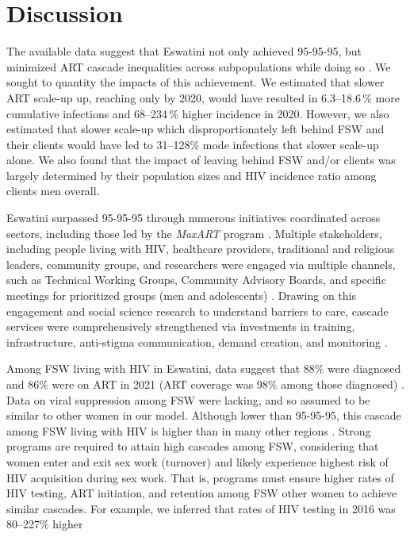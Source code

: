 \section{Discussion}\label{art.disc}
The available data suggest that Eswatini not only achieved 95-95-95,
but minimized ART cascade inequalities across subpopulations while doing so
\cite{SHIMS3,EswIBBS2022}.
We sought to quantity the impacts of this achievement.
We estimated that slower ART scale-up up, reaching only \casmd by 2020, would have resulted in
6.3--18.6\,\% more cumulative infections and 68--234\,\% higher incidence in 2020. %
However, we also estimated that
slower scale-up which disproportionately left behind FSW and their clients
would have led to 31--128\% mode infections that slower scale-up alone. %
We also found that the impact of leaving behind FSW and/or clients was largely determined by
their population sizes and HIV incidence ratio among clients \vs men overall. %
\par
Eswatini surpassed 95-95-95 through
numerous initiatives coordinated across sectors,
including those led by the \emph{MaxART} program \cite{MaxART1,MaxART2}.
Multiple stakeholders, including people living with HIV, healthcare providers,
traditional and religious leaders, community groups, and researchers
were engaged via multiple channels, such as
Technical Working Groups, Community Advisory Boards,
and specific meetings for prioritized groups (men and adolescents) \cite{MaxART1,MaxART2}.
Drawing on this engagement and
social science research to understand barriers to care,
cascade services were comprehensively strengthened via investments in
training, infrastructure, anti-stigma communication, demand creation, and monitoring
\cite{MaxART1,MaxART2}.
\par
Among FSW living with HIV in Eswatini, data suggest that
88\% were diagnosed and 86\% were on ART in 2021
(\ie ART coverage was 98\% among those diagnosed) \cite{EswIBBS2022}.
Data on viral suppression among FSW were lacking,
and so assumed to be similar to other women in our model.
Although lower than 95-95-95, this cascade among FSW living with HIV
is higher than in many other regions \cite{Schwartz2017,Hakim2018}.
Strong programs are required to attain high cascades among FSW,
considering that women enter and exit sex work (turnover) and
likely experience highest risk of HIV acquisition during sex work.
That is, programs must ensure higher rates of HIV testing, ART initiation, and retention
among FSW \vs other women to achieve similar cascades.
For example, we inferred that rates of HIV testing in 2016 was 80--227\% higher
